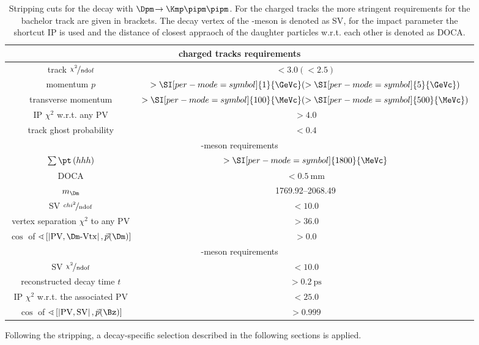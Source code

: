 \begin{table}[tbp]
	\centering
	\caption{Stripping cuts for the decay \BdToDpi with $\Dpm\!\to\Kmp\pipm\pipm$.
	For the charged tracks the more stringent requirements for the bachelor track are given in brackets.
	The decay vertex of the \Bz-meson is denoted as \ac{SV}, for the impact parameter the shortcut IP is used and the distance of closest appraoch of the \Dm daughter particles w.r.t. each other is denoted as DOCA.}
	\begin{tabular}{cc}
		\toprule
		\multicolumn{2}{c}{charged tracks requirements}\\
		\midrule
		track $\nicefrac{\chi^2}{\text{ndof}}$		& $<3.0 (<2.5)$ \\
		momentum $p$ 								& $>\SI[per-mode=symbol]{1}{\GeVc} (>\SI[per-mode=symbol]{5}{\GeVc})$ \\
		transverse momentum \pt 					& $>\SI[per-mode=symbol]{100}{\MeVc} (>\SI[per-mode=symbol]{500}{\MeVc})$ \\
		IP $\chi^2$ w.r.t. any \ac{PV}				& $>4.0$ \\
		track ghost probability 					& $<0.4$ \\
		\midrule
		\multicolumn{2}{c}{\Dm-meson requirements}\\
		\midrule
		$\sum \pt\left(hhh\right)$ 																				& $>\SI[per-mode=symbol]{1800}{\MeVc}$ \\
		DOCA 																									& $<\SI{0.5}{\milli\metre}$ \\
		$m_\Dm$ 																								& \SIrange[per-mode=symbol]{1769.92}{2068.49}{\MeVcc} \\
		\ac{SV} $\nicefrac{chi^2}{\text{ndof}}$ 																	& $<10.0$ \\
		vertex separation $\chi^2$ to any \ac{PV} 																	& $>36.0$ \\
		$\cos$ of $\sphericalangle\left[\left|\text{PV},\Dm\text{-Vtx}\right|, \vec{p}\!\left(\Dm\right)\right]$	& $>0.0$ \\
		\midrule
		\multicolumn{2}{c}{\Bz-meson requirements}\\
		\midrule
		\ac{SV} $\nicefrac{\chi^2}{\text{ndof}}$ 																& $<10.0$ \\
		reconstructed decay time $t$ 																			& $>\SI{0.2}{\pico\second}$ \\
		IP $\chi^2$ w.r.t. the associated \ac{PV} 																& $<25.0$ \\
		$\cos$ of $\sphericalangle\left[\left|\text{PV},\text{SV}\right|, \vec{p}\!\left(\Bz\right)\right]$		& $>0.999$ \\
		\bottomrule
	\end{tabular}
	\label{tab:stripping}
\end{table}
Following the stripping, a decay-specific selection described in the following sections is applied.

